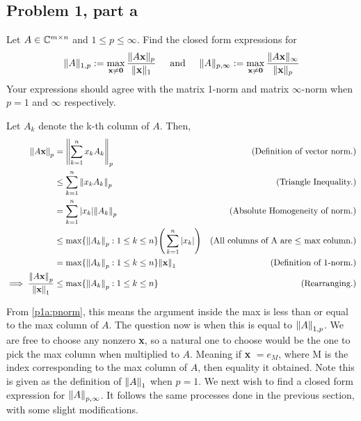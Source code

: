 \subsection{Problem 1, part a} Let $A \in \mathbb{C}^{m \times n}$ and $1 \leq p \leq \infty$. Find the closed form expressions for 
\[
\lVert A \rVert_{1, p} := \max_{\textbf{x} \neq \textbf{0}} \frac{\lVert A\textbf{x} \rVert_{p}}{\lVert \textbf{x} \rVert_1} \hspace{5mm} \text{and} \hspace{5mm} \lVert A \rVert_{p, \infty} := \max_{\textbf{x} \neq \textbf{0}} \frac{\lVert A\textbf{x} \rVert_{\infty}}{\lVert \textbf{x} \rVert_p} 
\]
Your expressions should agree with the matrix 1-norm and matrix $\infty$-norm when $p = 1$ and $\infty$ respectively.
\partbreak
\begin{solution}

    Let $A_k$ denote the k-th column of $A$. Then, 
    \alignbreak
    \begin{align}
        \norm{A\textbf{x}}_p &= \norm{\sum_{k = 1}^n x_kA_k}_p &\text{(Definition of vector norm.)}\nonumber\\
        &\leq \sum_{k = 1}^n \norm{x_kA_k}_p &\text{(Triangle Inequality.)}\nonumber\\
        &= \sum_{k = 1}^n|x_k|\norm{A_k}_p &\text{(Absolute Homogeneity of norm.)}\nonumber\\
        &\leq \max \{ \norm{A_k}_p : 1 \leq k \leq n \} \Bigg(\sum_{k = 1}^n |x_k| \Bigg) &\text{(All columns of A are $\leq$ max column.)}\nonumber\\
        &=\max \{ \norm{A_k}_p : 1 \leq k \leq n \} \norm{\textbf{x}}_1 &\text{(Definition of 1-norm.)}\nonumber\\
        \implies \frac{\norm{A\textbf{x}}_p}{\norm{\textbf{x}}_1} &\leq \max \{\norm{A_k}_p : 1 \leq k \leq n \} &\text{(Rearranging.)}\label{p1a:pnorm}
    \end{align}
    \alignbreak

    From \ref{p1a:pnorm}, this means the argument inside the max is less than or equal to the max column of $A$. The question now is when this is equal to $\norm{A}_{1,p}$. We are free to choose any nonzero \textbf{x}, so a natural one to choose would be the one to pick the max column when multiplied to $A$. Meaning if \textbf{x} $= e_M$, where M is the index corresponding to the max column of $A$, then equality it obtained. Note this is given as the definition of $\norm{A}_1$ when $p = 1$. 
\newpage
        We next wish to find a closed form expression for $\norm{A}_{p, \infty}$. It follows the same processes done in the previous section, with some slight modifications.


\end{solution}
